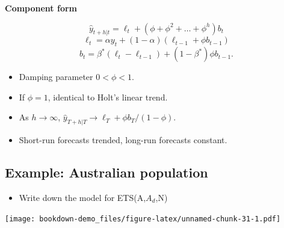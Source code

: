 \documentclass[]{book}
\newenvironment{Shaded}{\begin{snugshade}}{\end{snugshade}}
\newcommand{\DataTypeTok}[1]{\textcolor[rgb]{0.13,0.29,0.53}{#1}}
\newcommand{\DecValTok}[1]{\textcolor[rgb]{0.00,0.00,0.81}{#1}}
\newcommand{\KeywordTok}[1]{\textcolor[rgb]{0.13,0.29,0.53}{\textbf{#1}}}
\newcommand{\NormalTok}[1]{#1}
\newcommand{\OperatorTok}[1]{\textcolor[rgb]{0.81,0.36,0.00}{\textbf{#1}}}
\newcommand{\StringTok}[1]{\textcolor[rgb]{0.31,0.60,0.02}{#1}}
\providecommand{\tightlist}{%
  \setlength{\itemsep}{0pt}\setlength{\parskip}{0pt}}
\begin{document}
\textbf{Component form}

\[\hat{y}_{t+h|t} = \ell_{t} + (\phi+\phi^2 + \dots + \phi^{h})b_{t}\]
\[\ell_{t} = \alpha y_{t} + (1 - \alpha)(\ell_{t-1} + \phi b_{t-1})\]
\[b_{t} = \beta^*(\ell_{t} - \ell_{t-1}) + (1 -\beta^*)\phi b_{t-1}.\]

\begin{itemize}
\tightlist
\item
  Damping parameter \(0<\phi<1\).
\item
  If \(\phi=1\), identical to Holt's linear trend.
\item
  As \(h\rightarrow\infty\), \(\hat{y}_{T+h|T}\rightarrow \ell_T+\phi b_T/(1-\phi)\).
\item
  Short-run forecasts trended, long-run forecasts constant.
\end{itemize}

\hypertarget{example-australian-population-1}{%
\subsection{Example: Australian population}\label{example-australian-population-1}}

\begin{itemize}
\tightlist
\item
  Write down the model for ETS(A,\(A_d\),N)
\end{itemize}

\begin{Shaded}
\end{Shaded}

\texttt{[image: bookdown-demo\_files/figure-latex/unnamed-chunk-31-1.pdf]}
\end{document}
